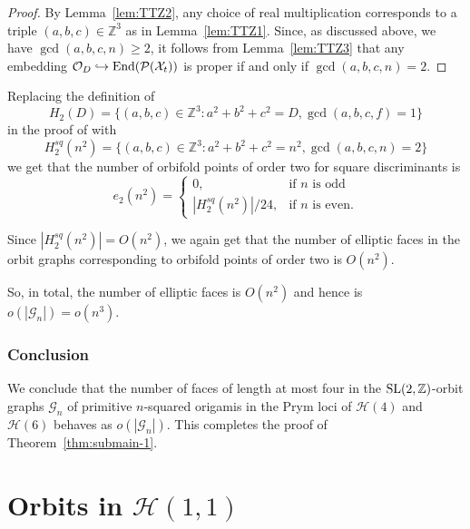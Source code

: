 \documentclass[a4paper,11pt]{amsart}
\numberwithin{equation}{section}
\numberwithin{figure}{section}
\numberwithin{table}{section}
\newcommand{\calH}{\mathcal{H}}
\newcommand{\Z}{\mathbb{Z}}
\DeclareMathOperator{\SL}{{\rm{SL}}}
\DeclareMathOperator{\End}{{\rm{End}}}
\begin{document}
\begin{proof}
    By Lemma~\ref{lem:TTZ2}, any choice of real multiplication corresponds to a triple $(a,b,c)\in\Z^3$ as in Lemma~\ref{lem:TTZ1}. Since, as discussed above, we have $\gcd(a,b,c,n)\geq 2$, it follows from Lemma~\ref{lem:TTZ3} that any embedding $\mathcal{O}_{D} \hookrightarrow \End(\mathcal{P}(\mathcal{X}_{t}))$ is proper if and only if $\gcd(a,b,c,n) = 2$.
\end{proof}

Replacing the definition of 
\[H_{2}(D) = \{(a,b,c)\in\Z^3:a^2+b^2+c^2 = D, \gcd(a,b,c,f) = 1\}\]
in the proof of \cite[Theorem 5.1]{TTZ18} with
\[H^{sq}_{2}(n^2) = \{(a,b,c)\in\Z^{3}:a^2+b^2+c^2 = n^2, \gcd(a,b,c,n) = 2\}\]
we get that the number of orbifold points of order two for square discriminants is
\[e_{2}(n^2) = \left\lbrace\begin{array}{cl}
    0, & \text{if }n\text{ is odd}\\
    |H^{sq}_{2}(n^2)|/24, & \text{if }n\text{ is even}.
\end{array}\right.\]

Since $|H^{sq}_{2}(n^2)| = O(n^2)$, we again get that the number of elliptic faces in the orbit graphs corresponding to orbifold points of order two is $O(n^2)$.

So, in total, the number of elliptic faces is $O(n^2)$ and hence is $o(|\mathcal{G}_{n}|) = o(n^3)$.

\subsubsection{Conclusion} We conclude that the number of faces of length at most four in the $\SL(2,\Z)$-orbit graphs $\mathcal{G}_{n}$ of primitive $n$-squared origamis in the Prym loci of $\calH(4)$ and $\calH(6)$ behaves as $o(|\mathcal{G}_{n}|)$. This completes the proof of Theorem~\ref{thm:submain-1}.


\section{Orbits in $\calH(1,1)$}\label{sec:H(1,1)}
\end{document}
